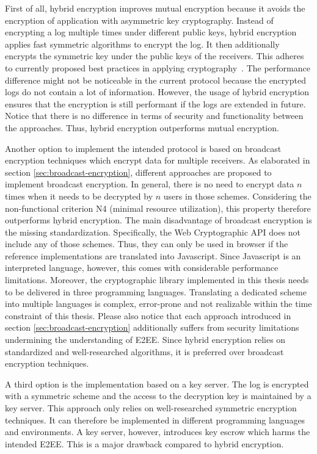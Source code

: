 \documentclass[../main.tex]{subfiles}
\begin{document}
First of all, hybrid encryption improves mutual encryption because it avoids the encryption of application with asymmetric key cryptography.
Instead of encrypting a log multiple times under different public keys, hybrid encryption applies fast symmetric algorithms to encrypt the log.
It then additionally encrypts the symmetric key under the public keys of the receivers.
This adheres to currently proposed best practices in applying cryptography~\cite[340]{Eckert2018}.
The performance difference might not be noticeable in the current protocol because the encrypted logs do not contain a lot of information.
However, the usage of hybrid encryption ensures that the encryption is still performant if the logs are extended in future.
Notice that there is no difference in terms of security and functionality between the approaches.
Thus, hybrid encryption outperforms mutual encryption.

Another option to implement the intended protocol is based on broadcast encryption techniques which encrypt data for multiple receivers.
As elaborated in section \ref{sec:broadcast-encryption}, different approaches are proposed to implement broadcast encryption.
In general, there is no need to encrypt data $n$ times when it needs to be decrypted by $n$ users in those schemes.
Considering the non-functional criterion N4 (minimal resource utilization), this property therefore outperforms hybrid encryption.
The main disadvantage of broadcast encryption is the missing standardization.
Specifically, the Web Cryptographic API does not include any of those schemes.
Thus, they can only be used in browser if the reference implementations are translated into Javascript.
Since Javascript is an interpreted language, however, this comes with considerable performance limitations.
Moreover, the cryptographic library implemented in this thesis needs to be delivered in three programming languages.
Translating a dedicated scheme into multiple languages is complex, error-prone and not realizable within the time constraint of this thesis.
Please also notice that each approach introduced in section \ref{sec:broadcast-encryption} additionally suffers from security limitations undermining the understanding of E2EE.
Since hybrid encryption relies on standardized and well-researched algorithms, it is preferred over broadcast encryption techniques.

A third option is the implementation based on a key server.
The log is encrypted with a symmetric scheme and the access to the decryption key is maintained by a key server.
This approach only relies on well-researched symmetric encryption techniques.
It can therefore be implemented in different programming languages and environments.
A key server, however, introduces key escrow which harms the intended E2EE.
This is a major drawback compared to hybrid encryption.
\end{document}
